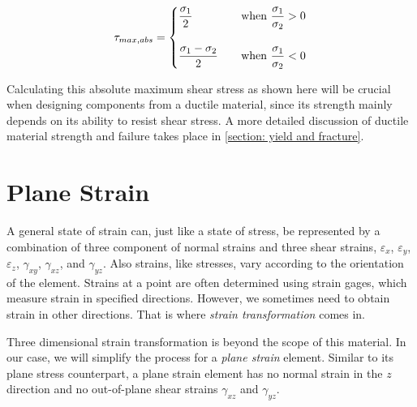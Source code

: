 \documentclass[
10pt,
a4paper,
openany,
svgnames,
]{book} %
\begin{document}
\begin{equation}
  \tau_{max,abs} = \left\{
    \begin{gathered}
      \dfrac{\sigma_1}{2} \hspace{1.5cm} \text{when } \dfrac{\sigma_1}{\sigma_2} > 0 \\[10pt]
      \dfrac{\sigma_1 - \sigma_2}{2} \hfill \text{when } \dfrac{\sigma_1}{\sigma_2} < 0
    \end{gathered}
  \right.
\end{equation}

Calculating this absolute maximum shear stress as shown here will be crucial when designing components from a ductile material, since its strength mainly depends on its ability to resist shear stress. A more detailed discussion of ductile material strength and failure takes place in \cref{section: yield and fracture}.

\section{Plane Strain}

A general state of strain can, just like a state of stress, be represented by a combination of three component of normal strains and three shear strains, $\varepsilon_x$, $\varepsilon_y$, $\varepsilon_z$, $\gamma_{xy}$, $\gamma_{xz}$, and $\gamma_{yz}$. Also strains, like stresses, vary according to the orientation of the element. Strains at a point are often determined using strain gages, which measure strain in specified directions. However, we sometimes need to obtain strain in other directions. That is where \emph{strain transformation} comes in.

Three dimensional strain transformation is beyond the scope of this material. In our case, we will simplify the process for a \emph{plane strain} element. Similar to its plane stress counterpart, a plane strain element has no normal strain in the $z$ direction and no out-of-plane shear strains $\gamma_{xz}$ and $\gamma_{yz}$.
\end{document}
